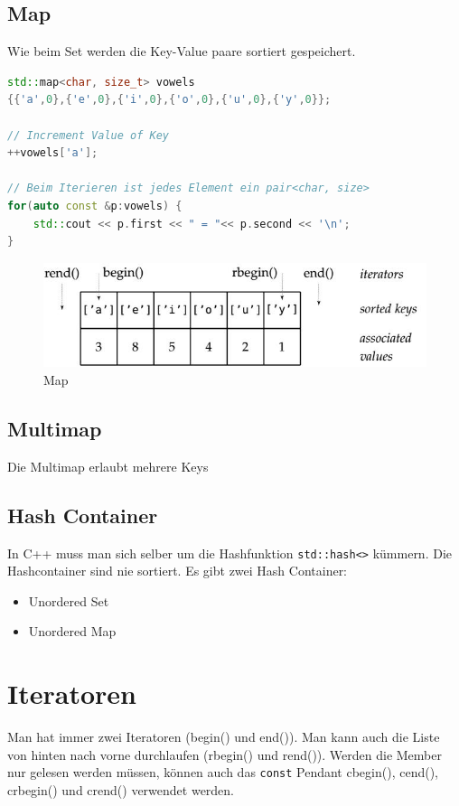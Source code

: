 \subsection{Map}
Wie beim Set werden die Key-Value paare sortiert gespeichert.
\begin{lstlisting}[language=C++]
std::map<char, size_t> vowels
{{'a',0},{'e',0},{'i',0},{'o',0},{'u',0},{'y',0}};

// Increment Value of Key
++vowels['a'];

// Beim Iterieren ist jedes Element ein pair<char, size>
for(auto const &p:vowels) { 
	std::cout << p.first << " = "<< p.second << '\n';
}
\end{lstlisting}
\begin{figure}[h]
\centering
\includegraphics[width=0.5\linewidth]{images/map}
\caption{Map}
\label{fig:map}
\end{figure}

\newpage
\subsection{Multimap}
Die Multimap erlaubt mehrere Keys

\subsection{Hash Container}
In C++ muss man sich selber um die Hashfunktion \lstinline[]|std::hash<>| kümmern. Die Hashcontainer sind nie sortiert. Es gibt zwei Hash Container:

\begin{itemize}
	\item Unordered Set
	\item Unordered Map
\end{itemize}


\section{Iteratoren}
Man hat immer zwei Iteratoren (begin() und end()). Man kann auch die Liste von hinten nach vorne durchlaufen (rbegin() und rend()). Werden die Member nur gelesen werden müssen, können auch das \lstinline|const| Pendant cbegin(), cend(), crbegin() und crend() verwendet werden.

